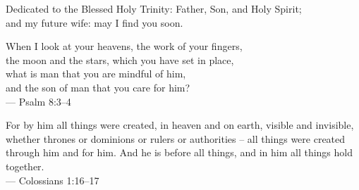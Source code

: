 \vfill
{
\begin{center}
Dedicated to the Blessed Holy Trinity:
Father, Son, and Holy Spirit; \\ and my future wife: may I find you soon.
\end{center}
}
\vfill

{
\noindent When I look at your heavens, the work of your fingers, \\
\indent    the moon and the stars, which you have set in place, \\
\noindent what is man that you are mindful of him, \\
\indent    and the son of man that you care for him? \\
\noindent --- Psalm 8:3--4
}

\vspace{0.5cm}

{
\noindent
For by him all things were created, in heaven and on earth,
    visible and invisible, whether thrones or dominions
    or rulers or authorities -- all things were created through him
    and for him. And he is before all things, and in him all things
    hold together. \\
\noindent --- Colossians 1:16--17
}

\vfill
